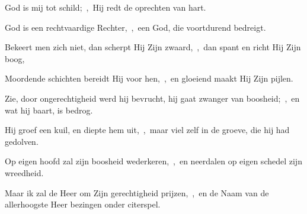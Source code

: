 \documentclass[12pt,twoside,a5paper]{article}
\begin{document}
\begin{halfparskip}
  God is mij tot schild;~\sep\ Hij redt de oprechten van hart.

  God is een rechtvaardige Rechter,~\sep\ een God, die voortdurend bedreigt.

  Bekeert men zich niet, dan scherpt Hij Zijn zwaard,~\sep\ dan spant en richt Hij Zijn boog,

  Moordende schichten bereidt Hij voor hen,~\sep\ en gloeiend maakt Hij Zijn pijlen.

  Zie, door ongerechtigheid werd hij bevrucht, hij gaat zwanger van boosheid;~\sep\ en wat hij baart, is bedrog.

  Hij groef een kuil, en diepte hem uit,~\sep\ maar viel zelf in de groeve, die hij had gedolven.

  Op eigen hoofd zal zijn boosheid wederkeren,~\sep\ en neerdalen op eigen schedel zijn wreedheid.

  Maar ik zal de Heer om Zijn gerechtigheid prijzen,~\sep\ en de Naam van de allerhoogste Heer bezingen onder citerspel.
\end{halfparskip}


\end{document}
